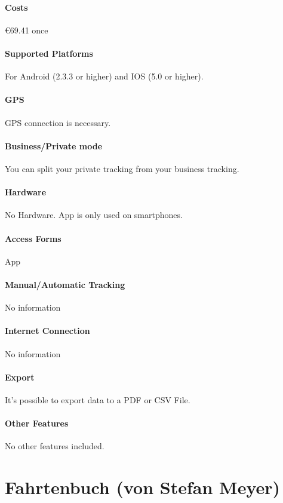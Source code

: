 \paragraph{Costs} \euro 69.41 once
\paragraph{Supported Platforms} For Android (2.3.3 or higher) and IOS (5.0 or higher).
\paragraph{GPS} GPS connection is necessary.
\paragraph{Business/Private mode} You can split your private tracking from your business tracking.
\paragraph{Hardware} No Hardware. App is only used on smartphones.
\paragraph{Access Forms} App
\paragraph{Manual/Automatic Tracking} No information
\paragraph{Internet Connection}No information
\paragraph{Export} It’s possible to export data to a PDF or CSV File.
\paragraph{Other Features} No other features included.
\newpage

\section{Fahrtenbuch (von Stefan Meyer)}
